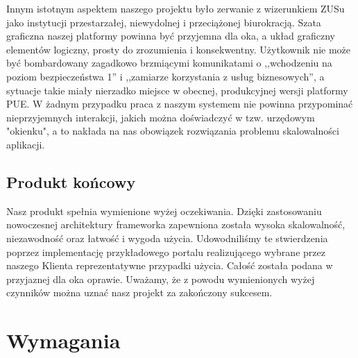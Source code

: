 \documentclass[licencjacka]{pracamgr}
\begin{document}
Innym istotnym aspektem naszego projektu było zerwanie z wizerunkiem ZUSu jako
instytucji przestarzałej, niewydolnej i przeciążonej biurokracją. Szata graficzna naszej platformy powinna być przyjemna dla oka, a układ
graficzny elementów logiczny, prosty do zrozumienia i konsekwentny. Użytkownik
nie może być bombardowany zagadkowo brzmiącymi komunikatami o ,,wchodzeniu na
poziom bezpieczeństwa 1'' i ,,zamiarze korzystania z usług biznesowych'', a sytuacje takie miały nierzadko miejsce w obecnej, produkcyjnej wersji platformy PUE. 
W żadnym przypadku praca z naszym systemem nie powinna przypominać nieprzyjemnych interakcji, jakich można doświadczyć w tzw. urzędowym "okienku", a to
nakłada na nas obowiązek rozwiązania problemu skalowalności aplikacji.

\section{Produkt końcowy}

Nasz produkt spełnia wymienione wyżej oczekiwania. Dzięki zastosowaniu nowoczesnej
architektury frameworka zapewniona została wysoka skalowalność, niezawodność oraz
łatwość i wygoda użycia. Udowodniliśmy te stwierdzenia poprzez implementację przykładowego
portalu realizującego wybrane przez naszego Klienta reprezentatywne przypadki użycia.
Całość została podana w przyjaznej dla oka oprawie. Uważamy, że z powodu wymienionych
wyżej czynników można uznać nasz projekt za zakończony sukcesem.

\chapter{Wymagania}
\end{document}
